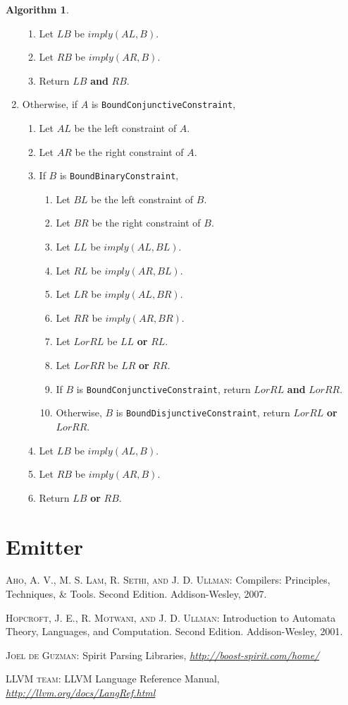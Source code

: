 \documentclass[a4paper,oneside,11pt]{book}
\theoremstyle{definition}
\newtheorem{algo}{Algorithm}[section]
\begin{document}
\begin{algo}
\begin{enumerate}
\begin{enumerate}
\item
Let $LB$ be $imply(AL, B)$.
\item
Let $RB$ be $imply(AR, B)$.
\item
Return $LB$ \textbf{and} $RB$.
\end{enumerate}
\item
Otherwise, if $A$ is \verb|BoundConjunctiveConstraint|,
\begin{enumerate}
\item
Let $AL$ be the left constraint of $A$.
\item
Let $AR$ be the right constraint of $A$.
\item
If $B$ is \verb|BoundBinaryConstraint|,
\begin{enumerate}
\item
Let $BL$ be the left constraint of $B$.
\item
Let $BR$ be the right constraint of $B$.
\item
Let $LL$ be $imply(AL, BL)$.
\item
Let $RL$ be $imply(AR, BL)$.
\item
Let $LR$ be $imply(AL, BR)$.
\item
Let $RR$ be $imply(AR, BR)$.
\item
Let $LorRL$ be $LL$ \textbf{or} $RL$.
\item
Let $LorRR$ be $LR$ \textbf{or} $RR$.
\item
If $B$ is \verb|BoundConjunctiveConstraint|, return $LorRL$ \textbf{and} $LorRR$.
\item
Otherwise, $B$ is \verb|BoundDisjunctiveConstraint|, return $LorRL$ \textbf{or} $LorRR$.
\end{enumerate}
\item
Let $LB$ be $imply(AL, B)$.
\item
Let $RB$ be $imply(AR, B)$.
\item
Return $LB$ \textbf{or} $RB$.
\end{enumerate}
\end{enumerate}
\end{algo}

\chapter{Emitter}

\clearpage
\begin{thebibliography}{4}

 \textsc{Aho, A. V., M. S. Lam, R. Sethi, and J. D. Ullman}:
Compilers: Principles, Techniques, \& Tools. Second Edition. Addison-Wesley, 2007.

 \textsc{Hopcroft, J. E., R. Motwani, and J. D. Ullman}:
Introduction to Automata Theory, Languages, and Computation. Second Edition. Addison-Wesley, 2001.

 \textsc{Joel de Guzman}:
Spirit Parsing Libraries,
\textit{\url{http://boost-spirit.com/home/}}

 \textsc{LLVM team}:
LLVM Language Reference Manual,
\textit{\url{http://llvm.org/docs/LangRef.html}}

\end{thebibliography}
\end{document}
